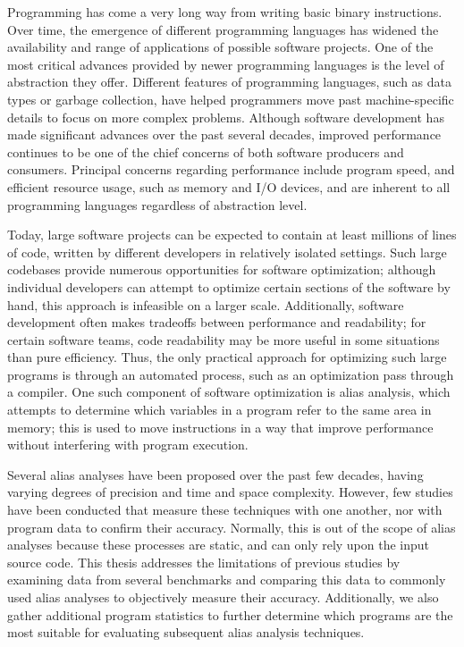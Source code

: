 Programming has come a very long way from writing basic binary instructions. Over time, the emergence of different programming languages has widened the availability and range of applications of possible software projects. One of the most critical advances provided by newer programming languages is the level of abstraction they offer. Different features of programming languages, such as data types or garbage collection, have helped programmers move past machine-specific details to focus on more complex problems. Although software development has made significant advances over the past several decades, improved performance continues to be one of the chief concerns of both software producers and consumers. Principal concerns regarding performance include program speed, and efficient resource usage, such as memory and I/O devices, and are inherent to all programming languages regardless of abstraction level.

Today, large software projects can be expected to contain at least millions of lines of code, written by different developers in relatively isolated settings. Such large codebases provide numerous opportunities for software optimization; although individual developers can attempt to optimize certain sections of the software by hand, this approach is infeasible on a larger scale. Additionally, software development often makes tradeoffs between performance and readability; for certain software teams, code readability may be more useful in some situations than pure efficiency. Thus, the only practical approach for optimizing such large programs is through an automated process, such as an optimization pass through a compiler. One such component of software optimization is alias analysis, which attempts to determine which variables in a program refer to the same area in memory; this is used to move instructions in a way that improve performance without interfering with program execution.

Several alias analyses have been proposed over the past few decades, having varying degrees of precision and time and space complexity. However, few studies have been conducted that measure these techniques with one another, nor with program data to confirm their accuracy. Normally, this is out of the scope of alias analyses because these processes are static, and can only rely upon the input source code. This thesis addresses the limitations of previous studies by examining data from several benchmarks and comparing this data to commonly used alias analyses to objectively measure their accuracy. Additionally, we also gather additional program statistics to further determine which programs are the most suitable for evaluating subsequent alias analysis techniques.
